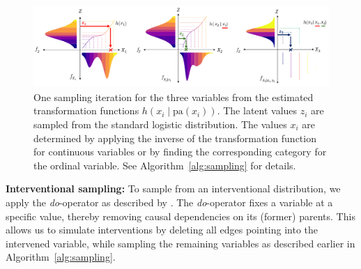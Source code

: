 \begin{figure}[H]  %
\centering
\includegraphics[width=1\textwidth]{img/sampling.png}
\caption{One sampling iteration for the three variables from the estimated transformation functions $h(x_i \mid \text{pa}(x_i))$. The latent values $z_i$ are sampled from the standard logistic distribution. The values $x_i$ are determined by applying the inverse of the transformation function for continuous variables or by finding the corresponding category for the ordinal variable. See Algorithm~\ref{alg:sampling} for details.}
\label{fig:sampling}
\end{figure}


% 



\textbf{Interventional sampling:} To sample from an interventional distribution, we apply the \textit{do}-operator as described by \citet{pearl1995}. The \textit{do}-operator fixes a variable at a specific value, thereby removing causal dependencies on its (former) parents. This allows us to simulate interventions by deleting all edges pointing into the intervened variable, while sampling the remaining variables as described earlier in Algorithm~\ref{alg:sampling}. 

% 

